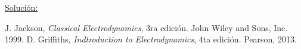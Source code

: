\documentclass[a4paper,11pt]{article}
\numberwithin{equation}{section}
\begin{document}
\vspace{.3cm}

\underline{Solución:} \vspace{.3cm}

\newpage

\begin{thebibliography}{10}
J. Jackson, \emph{Classical Electrodynamics}, 3ra edición. John Wiley and Sons, Inc. 
1999.
D. Griffiths, \emph{Indtroduction to Electrodynamics}, 4ta edición. Pearson, 2013.
\end{thebibliography}
\end{document}

